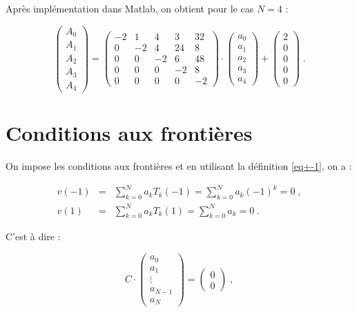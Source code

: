 \documentclass{report}
\begin{document}
Après implémentation dans Matlab, on obtient pour le cas $N=4$ :

\begin{equation}
\begin{pmatrix}
 A_{0}\\ 
 A_{1}\\ 
 A_{2}\\ 
 A_{3}\\ 
 A_{4}
\end{pmatrix} = \begin{pmatrix}
-2 & 1 & 4 & 3 & 32\\ 
0 & -2 & 4 & 24 & 8\\ 
0 & 0 & -2 & 6 & 48\\ 
0 & 0 & 0 & -2 & 8\\ 
0 & 0 & 0 & 0 & -2
\end{pmatrix} \cdot \begin{pmatrix}
 a_0\\ 
 a_1\\ 
 a_2\\ 
 a_3\\ 
 a_4
\end{pmatrix}+\begin{pmatrix}
 2\\ 
 0\\ 
 0\\ 
 0\\ 
 0
\end{pmatrix}\;.
\end{equation}

\section{Conditions aux frontières}

On impose les conditions aux frontières et en utilisant la définition \eqref{eq+-1}, on a :

\begin{eqnarray}
v(-1) &=& \sum_{k=0}^N a_k T_k(-1) = \sum_{k=0}^N a_k (-1)^{k} = 0\;,\\
v(1) &=& \sum_{k=0}^N a_k T_k(1) = \sum_{k=0}^N a_k = 0\;.
\end{eqnarray}

C'est à dire :

\begin{equation}
 C \cdot \begin{pmatrix}
 a_0\\ 
 a_1\\ 
 \vdots\\ 
 a_{N-1}\\ 
 a_{N}
\end{pmatrix}
= \begin{pmatrix}
 0\\  
 0
\end{pmatrix}\;,\label{cf}
\end{equation}
\end{document}
